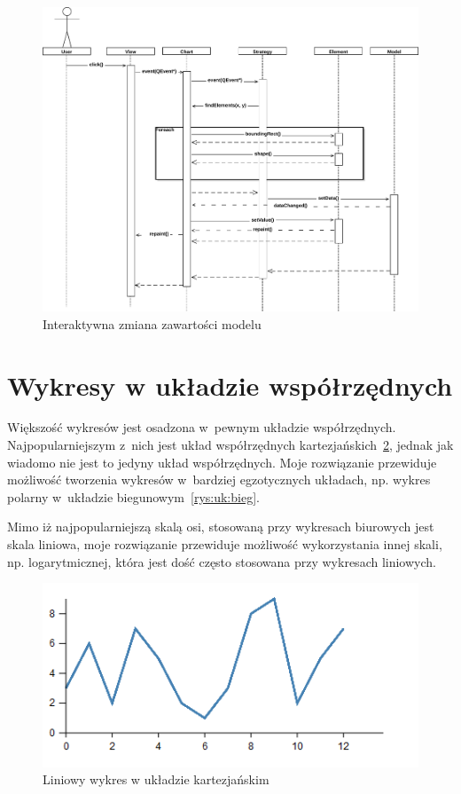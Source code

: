 \begin{figure}[H]
\centering
\includegraphics[scale=0.6]{img/seq_inter.pdf}
\caption{Interaktywna zmiana zawartości modelu}\label{rys:seq:inter}
\end{figure}

\section{Wykresy w układzie współrzędnych}
Większość wykresów jest osadzona w~pewnym układzie współrzędnych. Najpopularniejszym z~nich jest układ współrzędnych kartezjańskich~\ref{rys:uk:kart}, jednak jak wiadomo nie jest to jedyny układ współrzędnych. Moje rozwiązanie przewiduje możliwość tworzenia wykresów w~bardziej egzotycznych układach, np. wykres polarny w~układzie biegunowym~\ref{rys:uk:bieg}.

Mimo iż najpopularniejszą skalą osi, stosowaną przy wykresach biurowych jest skala liniowa, moje rozwiązanie przewiduje możliwość wykorzystania innej skali, np. logarytmicznej, która jest dość często stosowana przy wykresach liniowych. 

\begin{figure}[H]
\centering
\includegraphics[scale=0.65]{img/kartezjanski.png}
\caption{Liniowy wykres w układzie kartezjańskim}\label{rys:uk:kart}
\end{figure}

